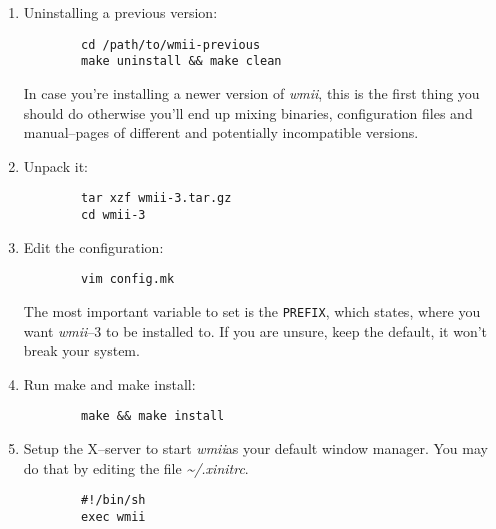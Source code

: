 \documentclass[12pt,a4paper]{article} %
\newcommand{\wmii}{\emph{wmii}}
\begin{document}
    \begin{enumerate}
      
    \item Uninstalling a previous version:
      \begin{verbatim}
        cd /path/to/wmii-previous
        make uninstall && make clean 
      \end{verbatim}

      In case you're installing a newer version of \wmii, this is the
      first thing you should do otherwise you'll end up mixing
      binaries, configuration files and manual--pages of different and
      potentially incompatible versions.

    \item Unpack it:
      \begin{verbatim}
        tar xzf wmii-3.tar.gz
        cd wmii-3
      \end{verbatim}
      
    \item Edit the configuration:
      \begin{verbatim}
        vim config.mk
      \end{verbatim}
      
      The most important variable to set is the \verb+PREFIX+, which
      states, where you want \wmii --3 to be installed to. If you are unsure, keep the
      default, it won't break your system.
      
    \item Run make and make install:
      \begin{verbatim}
        make && make install
      \end{verbatim}
      
    \item Setup the X--server to start \wmii as your default window
      manager. You may do that by editing the file \emph{\~{}/.xinitrc}.

      \begin{verbatim}
        #!/bin/sh
        exec wmii
      \end{verbatim}


    \end{enumerate}
    
\end{document}
